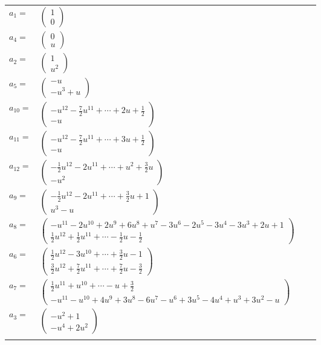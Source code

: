 \documentclass[1p]{elsarticle_modified}
\theoremstyle{definition}
\begin{document}
\begin{tabular}{m{7pt} m{180pt} m{7pt} m{180pt} }
\flushright $a_{1}=$&$\begin{pmatrix}1\\0\end{pmatrix}$ \\
\flushright $a_{4}=$&$\begin{pmatrix}0\\u\end{pmatrix}$ \\
\flushright $a_{2}=$&$\begin{pmatrix}1\\u^2\end{pmatrix}$ \\
\flushright $a_{5}=$&$\begin{pmatrix}- u\\- u^3+u\end{pmatrix}$ \\
\flushright $a_{10}=$&$\begin{pmatrix}- u^{12}-\frac{7}{2} u^{11}+\cdots+2 u+\frac{1}{2}\\- u\end{pmatrix}$ \\
\flushright $a_{11}=$&$\begin{pmatrix}- u^{12}-\frac{7}{2} u^{11}+\cdots+3 u+\frac{1}{2}\\- u\end{pmatrix}$ \\
\flushright $a_{12}=$&$\begin{pmatrix}-\frac{1}{2} u^{12}-2 u^{11}+\cdots+u^2+\frac{3}{2} u\\- u^2\end{pmatrix}$ \\
\flushright $a_{9}=$&$\begin{pmatrix}-\frac{1}{2} u^{12}-2 u^{11}+\cdots+\frac{3}{2} u+1\\u^3- u\end{pmatrix}$ \\
\flushright $a_{8}=$&$\begin{pmatrix}- u^{11}-2 u^{10}+2 u^9+6 u^8+u^7-3 u^6-2 u^5-3 u^4-3 u^3+2 u+1\\\frac{1}{2} u^{12}+\frac{1}{2} u^{11}+\cdots-\frac{1}{2} u-\frac{1}{2}\end{pmatrix}$ \\
\flushright $a_{6}=$&$\begin{pmatrix}\frac{1}{2} u^{12}-3 u^{10}+\cdots+\frac{3}{2} u-1\\\frac{3}{2} u^{12}+\frac{7}{2} u^{11}+\cdots+\frac{7}{2} u-\frac{3}{2}\end{pmatrix}$ \\
\flushright $a_{7}=$&$\begin{pmatrix}\frac{1}{2} u^{11}+u^{10}+\cdots- u+\frac{3}{2}\\- u^{11}- u^{10}+4 u^9+3 u^8-6 u^7- u^6+3 u^5-4 u^4+u^3+3 u^2- u\end{pmatrix}$ \\
\flushright $a_{3}=$&$\begin{pmatrix}- u^2+1\\- u^4+2 u^2\end{pmatrix}$\\&\end{tabular}
\end{document}
